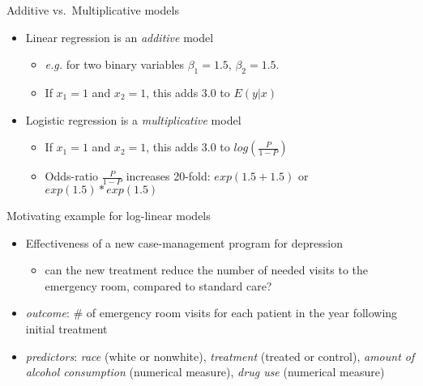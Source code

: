 \documentclass[ignorenonframetext,]{beamer}
\providecommand{\tightlist}{%
  \setlength{\itemsep}{0pt}\setlength{\parskip}{0pt}}
\begin{document}
\begin{frame}{Additive vs.~Multiplicative models}

\begin{itemize}
\tightlist
\item
  Linear regression is an \emph{additive} model

  \begin{itemize}
  \tightlist
  \item
    \emph{e.g.} for two binary variables \(\beta_1 = 1.5\),
    \(\beta_2 = 1.5\).
  \item
    If \(x_1=1\) and \(x_2=1\), this adds 3.0 to \(E(y|x)\)
  \end{itemize}
\item
  Logistic regression is a \emph{multiplicative} model

  \begin{itemize}
  \tightlist
  \item
    If \(x_1=1\) and \(x_2=1\), this adds 3.0 to \(log(\frac{P}{1-P})\)
  \item
    Odds-ratio \(\frac{P}{1-P}\) increases 20-fold: \(exp(1.5+1.5)\) or
    \(exp(1.5) * exp(1.5)\)
  \end{itemize}
\end{itemize}

\end{frame}

\begin{frame}{Motivating example for log-linear models}

\begin{itemize}
\tightlist
\item
  Effectiveness of a new case-management program for depression

  \begin{itemize}
  \tightlist
  \item
    can the new treatment reduce the number of needed visits to the
    emergency room, compared to standard care?
  \end{itemize}
\item
  \emph{outcome}: \# of emergency room visits for each patient in the
  year following initial treatment
\item
  \emph{predictors}: \emph{race} (white or nonwhite), \emph{treatment}
  (treated or control), \emph{amount of alcohol consumption} (numerical
  measure), \emph{drug use} (numerical measure)
\end{itemize}

\end{frame}
\end{document}
